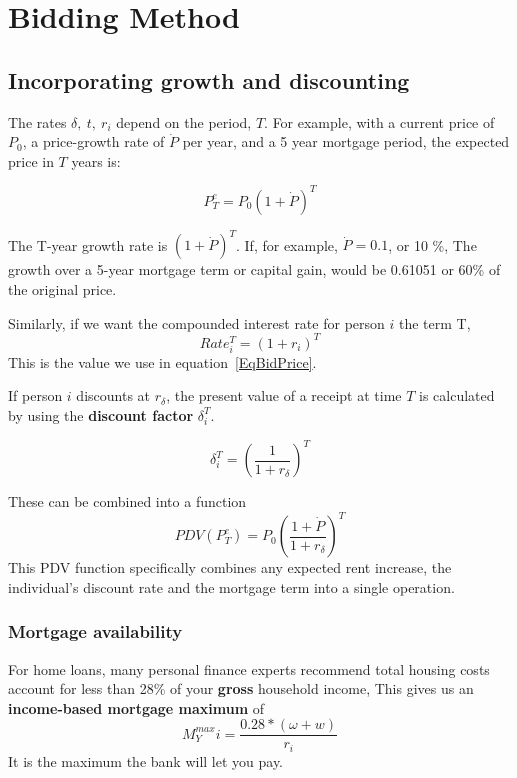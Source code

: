 \chapter[Bidding]{Bidding Method}
\label{AppendixA}


\section{Incorporating growth and discounting}
The rates $\delta,\ t,\ r_i$ depend on the period, $T$. For example, with a current price of $P_0$, a price-growth rate of $\dot P$ per year, and a 5 year mortgage period, the expected price in $T$ years is:

\[P^e_T=P_0(1+\dot P)^T\]

The T-year growth rate is $(1+\dot P)^T$. If, for example, $\dot P= 0.1$, or 10 \%, The growth  over a 5-year mortgage term or capital gain, would be 0.61051 or 60\% of the original price.

Similarly, if we want the compounded interest rate for person $i$ the term T,
\[Rate_i^T=(1+r_i)^T\]
This is the value we use in equation~\ref{EqBidPrice}.

If person $i$  discounts at $r_\delta$, the present value of  a receipt at time $T$ is calculated by using the \textbf{discount factor} $\delta_i^T$.

\[\delta_i^T= \left( \frac{1}{1+r_\delta} \right)^T \]
 
These can be combined into a function %
\[ PDV(P^e_T)=P_0\left( \frac{1+\dot P}{1+r_\delta} \right)^T \]
This PDV function specifically combines any expected rent increase, the individual's discount rate and the mortgage term into a single operation. 


\subsection{Mortgage availability}
For home loans, many personal finance experts recommend total housing costs account for less than 28\% of your \textbf{gross} household income, This gives us an \textbf{income-based  mortgage maximum} of \[M^{max}_Yi = \frac{0.28*(\omega+w)}{r_i}\] It is the maximum the bank will let you pay.

